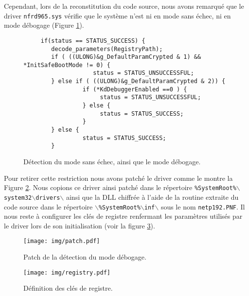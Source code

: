 \documentclass[times,11pt,fullpage]{article}
\newenvironment{changemargin}[2]{\begin{list}{}{%
\setlength{\topsep}{0pt}%
\setlength{\leftmargin}{0pt}%
\setlength{\rightmargin}{0pt}%
\setlength{\listparindent}{\parindent}%
\setlength{\itemindent}{\parindent}%
\setlength{\parsep}{0pt plus 1pt}%
\addtolength{\leftmargin}{#1}%
\addtolength{\rightmargin}{#2}%
}\item }{\end{list}}
\newcommand{\netpCONF}{\texttt{netp192.PNF}}
\begin{document}
Cependant, lors de la reconstitution du code source, nous avons remarqué que le driver \texttt{nfrd965.sys} vérifie que le système n'est ni en mode sans échec, ni en mode débogage (Figure \ref{fig:AntiDebug}). 
\begin{figure}
\scriptsize
\begin{framed}
\begin{verbatim}
     if(status == STATUS_SUCCESS) {
        decode_parameters(RegistryPath);
        if ( ((ULONG)&g_DefaultParamCrypted & 1) && *InitSafeBootMode != 0) {
                    status = STATUS_UNSUCCESSFUL;
        } else if ( ((ULONG)&g_DefaultParamCrypted & 2)) {
                 if (*KdDebuggerEnabled ==0 ) {
                      status = STATUS_UNSUCCESSFUL;
                 } else {
                      status = STATUS_SUCCESS;
                 }
        } else {
                 status = STATUS_SUCCESS;
        }
\end{verbatim}
\end{framed}

\caption{Détection du mode sans échec, ainsi que le mode débogage.\label{fig:AntiDebug}}
\end{figure}

Pour retirer cette restriction nous avons patché le driver comme le montre la Figure \ref{fig:patch}. Nous copions ce driver ainsi patché dans le répertoire \texttt{\%SystemRoot\%}$\backslash$\texttt{system32}$\backslash$\texttt{drivers}$\backslash$ ainsi que la DLL chiffrée à l'aide de la routine extraite du code source dans le répertoire $\backslash$\texttt{\%SystemRoot\%}$\backslash$\texttt{inf}$\backslash$ sous le nom \netpCONF. Il nous reste à configurer les clés de registre renfermant les paramètres utilisés par le driver lors de son initialisation (voir la figure \ref{fig:registry}).

\begin{figure}
\texttt{[image: img/patch.pdf]}
\caption{Patch de la détection du mode débogage.}
\label{fig:patch}
\end{figure}

\begin{figure}
\begin{center}
 \texttt{[image: img/registry.pdf]}
\end{center}
\caption{Définition des clés de registre.}
\label{fig:registry}
\end{figure}
\end{document}
